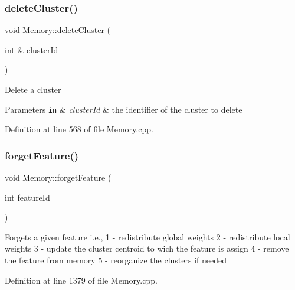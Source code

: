 \mbox{\label{class_memory_a97043ab11f12fdd595e18ffc1fcd2291}} 
\subsubsection{\texorpdfstring{delete\+Cluster()}{deleteCluster()}}
{\footnotesize\ttfamily void Memory\+::delete\+Cluster (\begin{DoxyParamCaption}\item[{int \&}]{cluster\+Id }\end{DoxyParamCaption})}

Delete a cluster


\begin{DoxyParams}[1]{Parameters}
\mbox{\tt in}  & {\em cluster\+Id} & the identifier of the cluster to delete \\
\hline
\end{DoxyParams}


Definition at line 568 of file Memory.\+cpp.

\mbox{\label{class_memory_add3f52953d79c8ace1de5d7c667a33d1}} 
\subsubsection{\texorpdfstring{forget\+Feature()}{forgetFeature()}}
{\footnotesize\ttfamily void Memory\+::forget\+Feature (\begin{DoxyParamCaption}\item[{int}]{feature\+Id }\end{DoxyParamCaption})\hspace{0.3cm}{\ttfamily [protected]}}

Forgets a given feature i.\+e., 1 -\/ redistribute global weights 2 -\/ redistribute local weights 3 -\/ update the cluster centroid to wich the feature is assign 4 -\/ remove the feature from memory 5 -\/ reorganize the clusters if needed 

Definition at line 1379 of file Memory.\+cpp.

\mbox{\label{class_memory_aa98d92e8d824eeb2e5699d6e1e2ff44b}} 
